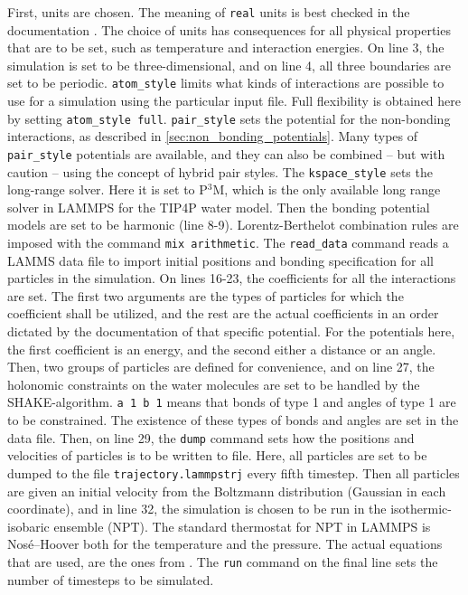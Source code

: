 First, units are chosen. The meaning of {\tt real} units is best checked in the documentation \cite{lammps:documentation}. The choice of units has consequences for all physical properties that are to be set, such as temperature and interaction energies. On line 3, the simulation is set to be three-dimensional, and on line 4, all three boundaries are set to be periodic. {\tt atom\_style} limits what kinds of interactions are possible to use for a simulation using the particular input file. Full flexibility is obtained here by setting {\tt atom\_style full}. {\tt pair\_style} sets the potential for the non-bonding interactions, as described in \ref{sec:non_bonding_potentials}. Many types of {\tt pair\_style} potentials are available, and they can also be combined -- but with caution -- using the concept of hybrid pair styles. The {\tt kspace\_style} sets the long-range solver. Here it is set to P$^3$M, which is the only available long range solver in LAMMPS for the TIP4P water model. Then the bonding potential models are set to be harmonic (line 8-9). Lorentz-Berthelot combination rules are imposed with the command {\tt mix arithmetic}. The {\tt read\_data} command reads a LAMMS data file to import initial positions and bonding specification for all particles in the simulation. On lines 16-23, the coefficients for all the interactions are set. The first two arguments are the types of particles for which the coefficient shall be utilized, and the rest are the actual coefficients in an order dictated by the documentation of that specific potential. For the potentials here, the first coefficient is an energy, and the second either a distance or an angle. Then, two groups of particles are defined for convenience, and on line 27, the holonomic constraints on the water molecules are set to be handled by the SHAKE-algorithm. {\tt a 1 b 1} means that bonds of type 1 and angles of type 1 are to be constrained. The existence of these types of bonds and angles are set in the data file. Then, on line 29, the {\tt dump} command sets how the positions and velocities of particles is to be written to file. Here, all particles are set to be dumped to the file {\tt trajectory.lammpstrj} every fifth timestep. Then all particles are given an initial velocity from the Boltzmann distribution (Gaussian in each coordinate), and in line 32, the simulation is chosen to be run in the isothermic-isobaric ensemble (NPT). The standard thermostat for NPT in LAMMPS is Nosé--Hoover both for the temperature and the pressure. The actual equations that are used, are the ones from \citet{shinoda2004rapid}.  The {\tt run} command on the final line sets the number of timesteps to be simulated.

